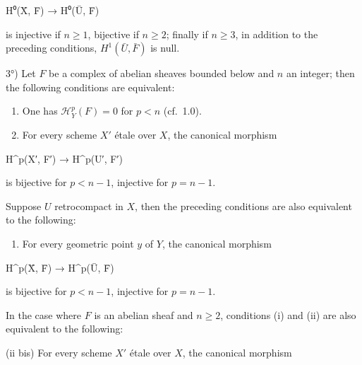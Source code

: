 \documentclass[
]{article}
\newenvironment{Shaded}{}{}
\newcommand{\NormalTok}[1]{#1}
\providecommand{\tightlist}{%
  \setlength{\itemsep}{0pt}\setlength{\parskip}{0pt}}
\begin{document}
\begin{Shaded}
\begin{Highlighting}[]
\NormalTok{H⁰(X̄, F̄) → H⁰(Ū, F̄)}
\end{Highlighting}
\end{Shaded}

is injective if \(n \geqslant 1\), bijective if \(n \geqslant 2\);
finally if \(n \geqslant 3\), in addition to the preceding conditions,
\(H^{1}(\bar{U}, \bar{F})\) is null.

3°) Let \(F\) be a complex of abelian sheaves bounded below and \(n\) an
integer; then the following conditions are equivalent:

\begin{enumerate}
\def\labelenumi{(\roman{enumi})}
\item
  One has \(\mathcal{H}^{p}_{Y}(F) = 0\) for \(p < n\) (cf.~1.0).
\item
  For every scheme \(X'\) étale over \(X\), the canonical morphism
\end{enumerate}

\begin{Shaded}
\begin{Highlighting}[]
\NormalTok{H\^{}p(X′, F′) → H\^{}p(U′, F′)}
\end{Highlighting}
\end{Shaded}

is bijective for \(p < n - 1\), injective for \(p = n - 1\).

Suppose \(U\) retrocompact in \(X\), then the preceding conditions are
also equivalent to the following:

\begin{enumerate}
\def\labelenumi{(\roman{enumi})}
\setcounter{enumi}{2}
\tightlist
\item
  For every geometric point \(y\) of \(Y\), the canonical morphism
\end{enumerate}

\begin{Shaded}
\begin{Highlighting}[]
\NormalTok{H\^{}p(X̄, F̄) → H\^{}p(Ū, F̄)}
\end{Highlighting}
\end{Shaded}

is bijective for \(p < n - 1\), injective for \(p = n - 1\).

In the case where \(F\) is an abelian sheaf and \(n \geqslant 2\),
conditions (i) and (ii) are also equivalent to the following:

(ii bis) For every scheme \(X'\) étale over \(X\), the canonical
morphism
\end{document}
